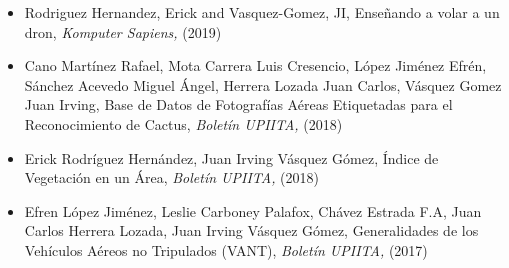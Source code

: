 \begin{itemize} 
\item Rodriguez Hernandez, Erick and Vasquez-Gomez, JI, Enseñando a volar a un dron,\textit{ Komputer Sapiens,} (2019)
\item Cano Martínez Rafael, Mota Carrera Luis Cresencio, López Jiménez Efrén, Sánchez Acevedo Miguel Ángel, Herrera Lozada Juan Carlos, Vásquez Gomez Juan Irving, Base de Datos de Fotografías Aéreas Etiquetadas para el Reconocimiento de Cactus,\textit{ Boletín UPIITA,} (2018)
\item Erick Rodríguez Hernández, Juan Irving Vásquez Gómez, Índice de Vegetación en un Área,\textit{ Boletín UPIITA,} (2018)
\item Efren López Jiménez, Leslie Carboney Palafox, Chávez Estrada F.A, Juan Carlos Herrera Lozada, Juan Irving Vásquez Gómez, Generalidades de los Vehículos Aéreos no Tripulados (VANT),\textit{ Boletín UPIITA,} (2017)
\end{itemize} 

